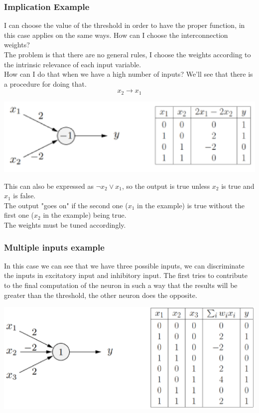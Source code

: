 \documentclass[11pt]{article}
\begin{document}
		\newpage
		
		\subsubsection{Implication Example}
		I can choose the value of the threshold in order to have the proper function, in this case applies on the same ways. How can I choose the interconnection weights? \\
		
		The problem is that there are no general rules, I choose the weights according to the intrinsic relevance of each input variable.\\
		
		How can I do that when we have a high number of inputs? We'll see that there is a procedure for doing that.
		$$ x_2 \rightarrow x_1 $$
		\begin{center}
			\includegraphics[width=0.85\columnwidth]{img/NN/TLU3}
		\end{center}
		
		This can also be expressed as $\neg x_2 \vee x_1$, so the output is true unless $x_2$ is true and $x_1$ is false.\\
		The output "goes on" if the second one ($x_1$ in the example) is true without the first one ($x_2$ in the example) being true.\\
		The weights must be tuned accordingly.\\
		
		\newpage
		
		\subsubsection{Multiple inputs example}
		In this case we can see that we have three possible inputs, we can discriminate the inputs in excitatory input and inhibitory input. The first tries to contribute to the final computation of the neuron in such a way that the results will be greater than the threshold, the other neuron does the opposite.
		
		\begin{center}
			\includegraphics[width=0.85\columnwidth]{img/NN/TLU4}
		\end{center}
		
\end{document}
